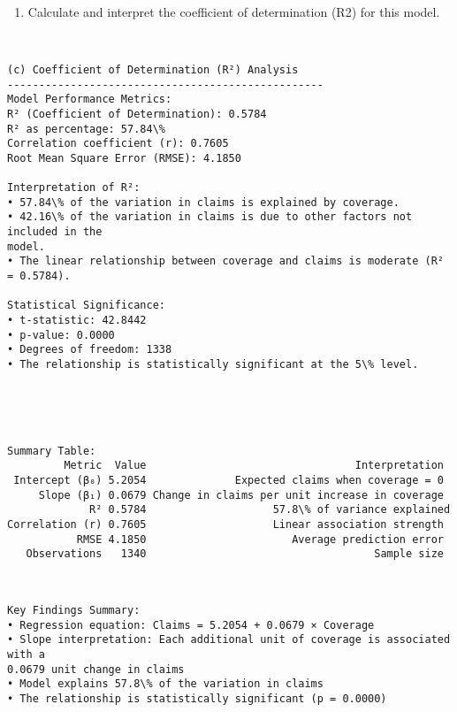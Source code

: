 \documentclass[8pt, twocolumn]{extarticle}
\providecommand{\tightlist}{%
      \setlength{\itemsep}{0pt}\setlength{\parskip}{0pt}}
\begin{document}
    \begin{enumerate}
\def\labelenumi{(\alph{enumi})}
\setcounter{enumi}{2}
\tightlist
\item
  Calculate and interpret the coefficient of determination (R2) for this
  model.
\end{enumerate}

    \begin{Verbatim}[commandchars=\\\{\}]


(c) Coefficient of Determination (R²) Analysis
--------------------------------------------------
Model Performance Metrics:
R² (Coefficient of Determination): 0.5784
R² as percentage: 57.84\%
Correlation coefficient (r): 0.7605
Root Mean Square Error (RMSE): 4.1850

Interpretation of R²:
• 57.84\% of the variation in claims is explained by coverage.
• 42.16\% of the variation in claims is due to other factors not included in the
model.
• The linear relationship between coverage and claims is moderate (R² = 0.5784).

Statistical Significance:
• t-statistic: 42.8442
• p-value: 0.0000
• Degrees of freedom: 1338
• The relationship is statistically significant at the 5\% level.
    \end{Verbatim}

    \begin{center}
    \end{center}
    { \hspace*{\fill} \\}
    
    \begin{Verbatim}[commandchars=\\\{\}]


Summary Table:
         Metric  Value                                 Interpretation
 Intercept (β₀) 5.2054              Expected claims when coverage = 0
     Slope (β₁) 0.0679 Change in claims per unit increase in coverage
             R² 0.5784                    57.8\% of variance explained
Correlation (r) 0.7605                    Linear association strength
           RMSE 4.1850                       Average prediction error
   Observations   1340                                    Sample size
    \end{Verbatim}

    \begin{Verbatim}[commandchars=\\\{\}]


Key Findings Summary:
• Regression equation: Claims = 5.2054 + 0.0679 × Coverage
• Slope interpretation: Each additional unit of coverage is associated with a
0.0679 unit change in claims
• Model explains 57.8\% of the variation in claims
• The relationship is statistically significant (p = 0.0000)
    \end{Verbatim}
\end{document}
